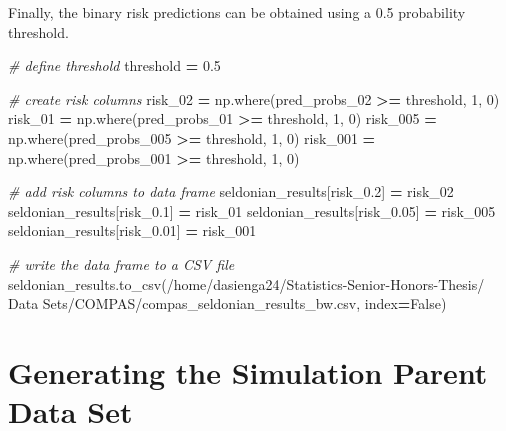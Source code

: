 \documentclass[12pt, twoside]{amherstthesis}
\newenvironment{Shaded}{\begin{snugshade}}{\end{snugshade}}
\newcommand{\CommentTok}[1]{\textcolor[rgb]{0.56,0.35,0.01}{\textit{#1}}}
\newcommand{\DecValTok}[1]{\textcolor[rgb]{0.00,0.00,0.81}{#1}}
\newcommand{\FloatTok}[1]{\textcolor[rgb]{0.00,0.00,0.81}{#1}}
\newcommand{\NormalTok}[1]{#1}
\newcommand{\OperatorTok}[1]{\textcolor[rgb]{0.81,0.36,0.00}{\textbf{#1}}}
\newcommand{\StringTok}[1]{\textcolor[rgb]{0.31,0.60,0.02}{#1}}
\newcommand{\VariableTok}[1]{\textcolor[rgb]{0.00,0.00,0.00}{#1}}
\begin{document}
\noindent Finally, the binary risk predictions can be obtained using a 0.5 probability threshold.
\begin{Shaded}
\begin{Highlighting}[]
\CommentTok{\# define threshold}
\NormalTok{threshold }\OperatorTok{=} \FloatTok{0.5}

\CommentTok{\# create risk columns}
\NormalTok{risk\_02 }\OperatorTok{=}\NormalTok{ np.where(pred\_probs\_02 }\OperatorTok{\textgreater{}=}\NormalTok{ threshold, }\DecValTok{1}\NormalTok{, }\DecValTok{0}\NormalTok{)}
\NormalTok{risk\_01 }\OperatorTok{=}\NormalTok{ np.where(pred\_probs\_01 }\OperatorTok{\textgreater{}=}\NormalTok{ threshold, }\DecValTok{1}\NormalTok{, }\DecValTok{0}\NormalTok{)}
\NormalTok{risk\_005 }\OperatorTok{=}\NormalTok{ np.where(pred\_probs\_005 }\OperatorTok{\textgreater{}=}\NormalTok{ threshold, }\DecValTok{1}\NormalTok{, }\DecValTok{0}\NormalTok{)}
\NormalTok{risk\_001 }\OperatorTok{=}\NormalTok{ np.where(pred\_probs\_001 }\OperatorTok{\textgreater{}=}\NormalTok{ threshold, }\DecValTok{1}\NormalTok{, }\DecValTok{0}\NormalTok{)}

\CommentTok{\# add risk columns to data frame}
\NormalTok{seldonian\_results[}\StringTok{\textquotesingle{}risk\_0.2\textquotesingle{}}\NormalTok{] }\OperatorTok{=}\NormalTok{ risk\_02}
\NormalTok{seldonian\_results[}\StringTok{\textquotesingle{}risk\_0.1\textquotesingle{}}\NormalTok{] }\OperatorTok{=}\NormalTok{ risk\_01}
\NormalTok{seldonian\_results[}\StringTok{\textquotesingle{}risk\_0.05\textquotesingle{}}\NormalTok{] }\OperatorTok{=}\NormalTok{ risk\_005}
\NormalTok{seldonian\_results[}\StringTok{\textquotesingle{}risk\_0.01\textquotesingle{}}\NormalTok{] }\OperatorTok{=}\NormalTok{ risk\_001}

\CommentTok{\# write the data frame to a CSV file}
\NormalTok{seldonian\_results.to\_csv(}\StringTok{\textquotesingle{}/home/dasienga24/Statistics{-}Senior{-}Honors{-}Thesis/\textquotesingle{}}
\StringTok{\textquotesingle{}Data Sets/COMPAS/compas\_seldonian\_results\_bw.csv\textquotesingle{}}\NormalTok{, index}\OperatorTok{=}\VariableTok{False}\NormalTok{)}
\end{Highlighting}
\end{Shaded}
\hypertarget{appendix-f}{%
\chapter{Generating the Simulation Parent Data Set}\label{appendix-f}}
\end{document}
